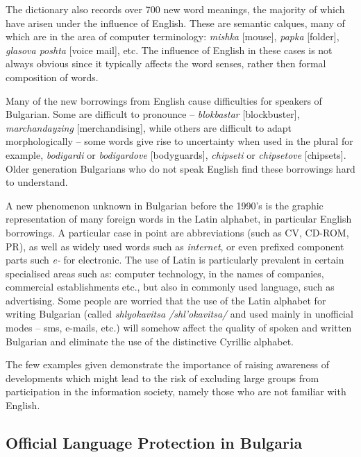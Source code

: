 \begin{multicols}{2}
  The dictionary also records over 700 new word meanings, the majority of which have arisen under the influence of English. These are semantic calques, many of which are in the area of computer terminology: \textit{{mishka}} [mouse], \textit{{papka}} [folder], \textit{{glasova poshta}} [voice mail], etc. The influence of English in these cases is not always obvious since it typically affects the word senses, rather then formal composition of words. 

  Many of the new borrowings from English cause difficulties for speakers of Bulgarian. Some are difficult to pronounce – \textit{{blokbastar}} [blockbuster], \textit{{marchandayzing}} [merchandising], while others are difficult to adapt morphologically -- some words give rise to uncertainty when used in the plural for example, \textit{{bodigardi}} or \textit{{bodigardove}} [bodyguards], \textit{{chipseti}} or \textit{{chipsetove}} [chipsets]. Older generation Bulgarians who do not speak English find these borrowings hard to understand. 

  A new phenomenon unknown in Bulgarian before the 1990’s is the graphic representation of many foreign words in the Latin alphabet, in particular English borrowings. A particular case in point are abbreviations (such as CV, CD-ROM, PR), as well as widely used words such as \textit{internet}, or even prefixed component parts such \textit{e-} for electronic. The use of Latin is particularly prevalent in certain specialised areas such as: computer technology, in the names of companies, commercial establishments etc., but also in commonly used language, such as advertising. Some people are worried that the use of the Latin alphabet for writing Bulgarian (called \textit{{shlyokavitsa} /shl’okavitsa/} and used mainly in unofficial modes -- sms, e-mails, etc.) \cite{shlyokavica} will somehow affect the quality of spoken and written Bulgarian and eliminate the use of the distinctive Cyrillic alphabet.

  The few examples given demonstrate the importance of raising awareness of developments which might lead to the risk of excluding large groups from participation in the information society, namely those who are not familiar with English.

  \subsection{Official Language Protection in Bulgaria}


\end{multicols}
